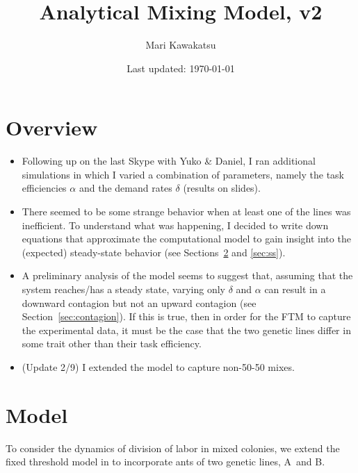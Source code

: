 \documentclass[10pt]{article}
\title{\LARGE Analytical Mixing Model, v2\vspace{-10pt}}
\author{Mari Kawakatsu\vspace{-15pt}}
\date{Last updated: \today\vspace{-15pt}}
\theoremstyle{remark}
\newcommand{\A}{{\color{red}A}}
\newcommand{\B}{{\color{blue}B}}
\begin{document}
\maketitle

\tableofcontents
\section{Overview}
\begin{itemize}
    \item Following up on the last Skype with Yuko \& Daniel, I ran additional simulations in which I varied a combination of parameters, namely the task efficiencies $\alpha$ and the demand rates $\delta$ (results on slides).
    
    \item There seemed to be some strange behavior when at least one of the lines was inefficient. To understand what was happening, I decided to write down equations that approximate the computational model to gain insight into the (expected) steady-state behavior (see Sections~\ref{sec:model} and \ref{sec:ss}).
    
    \item A preliminary analysis of the model seems to suggest that, assuming that the system reaches/has a steady state, varying only $\delta$ and $\alpha$ can result in a downward contagion but not an upward contagion (see Section~\ref{sec:contagion}). If this is true, then in order for the FTM to capture the experimental data, it must be the case that the two genetic lines differ in some trait other than their task efficiency.
    
    \item (Update 2/9) I extended the model to capture non-50-50 mixes.
    
\end{itemize}

\section{Model} \label{sec:model}

To consider the dynamics of division of labor in mixed colonies, we extend the fixed threshold model in \cite{ulrich18} to incorporate ants of two genetic lines, \A\ and \B. 
\end{document}
